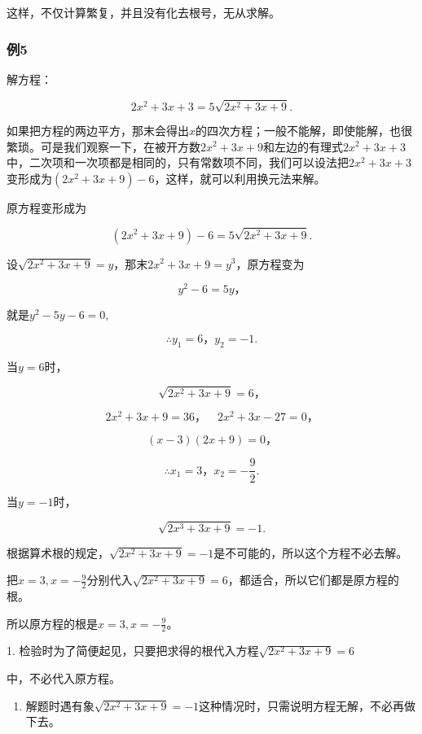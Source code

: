 这样，不仅计算繁复，并且没有化去根号，无从求解。

\subsubsection{例5}

解方程：

\[
2 x ^ {2} + 3 x + 3 = 5 \sqrt {2 x ^ {2} + 3 x + 9}.
\]

如果把方程的两边平方，那末会得出\(x\)的四次方程；一般不能解，即使能解，也很繁琐。可是我们观察一下，在被开方数\(2x^{2} + 3x + 9\)和左边的有理式\(2x^{2} + 3x + 3\)中，二次项和一次项都是相同的，只有常数项不同，我们可以设法把\(2x^{2} + 3x + 3\)变形成为\((2x^{2} + 3x + 9) - 6\)，这样，就可以利用换元法来解。

 原方程变形成为

\[
(2 x ^ {2} + 3 x + 9) - 6 = 5 \sqrt {2 x ^ {2} + 3 x + 9}.
\]

设\(\sqrt{2x^2 + 3x + 9} = y\)，那末\(2x^2 + 3x + 9 = y^3\)，原方程变为

\[
y ^ {2} - 6 = 5 y\text{，}
\]

就是\(y^{2} - 5y - 6 = 0,\)

\[
\therefore y _ {1} = 6\text{，} y _ {2} = - 1.
\]

当\(y = 6\)时，

\[
\sqrt {2 x ^ {2} + 3 x + 9} = 6\text{，}
\]

\[
2 x ^ {2} + 3 x + 9 = 36\text{，} \quad 2 x ^ {2} + 3 x - 27 = 0\text{，}
\]

\[
(x - 3) (2 x + 9) = 0\text{，}
\]

\[
\therefore x _ {1} = 3\text{，} x _ {2} = - \frac{9}{2}.
\]

当\(y = -1\)时，

\[
\sqrt {2 x ^ {3} + 3 x + 9} = - 1.
\]

根据算术根的规定，\(\sqrt{2x^2 + 3x + 9} = -1\)是不可能的，所以这个方程不必去解。

把\(x = 3, x = -\frac{9}{2}\)分别代入\(\sqrt{2x^2 + 3x + 9} = 6\)，都适合，所以它们都是原方程的根。

所以原方程的根是\(x = 3, x = -\frac{9}{2}\)。

 1.
检验时为了简便起见，只要把求得的根代入方程\(\sqrt{2x^2 + 3x + 9} = 6\)

中，不必代入原方程。

\begin{enumerate}[start=2]
\item
  解题时遇有象\(\sqrt{2x^2 + 3x + 9} = -1\)这种情况时，只需说明方程无解，不必再做下去。
\end{enumerate}

